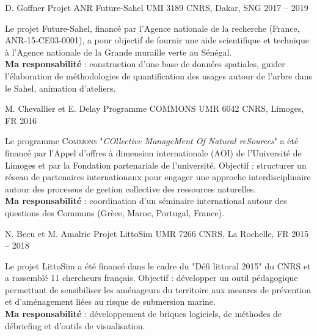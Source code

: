 \begin{cventries}
  \cventry
  {D. Goffner} %
  {Projet ANR Future-Sahel} %
  {UMI 3189 CNRS, Dakar, SNG} %
  {2017 -- 2019} %
  {
    \begin{cvitems} %
    Le projet Future-Sahel, financé par l’Agence nationale de la recherche (France, ANR‑15‑CE03‑0001), a pour objectif de fournir une aide scientifique et technique à l’Agence nationale de la Grande muraille verte au Sénégal.\\
    \textbf{Ma responsabilité} : construction d’une base de données spatiales, guider l'élaboration de méthodologies de quantification des usages autour de l’arbre dans le Sahel, animation d’ateliers.
    \end{cvitems}
  }

  \cventry
  {M. Chevallier et E. Delay} %
  {Programme COMMONS} %
  {UMR 6042 CNRS, Limoges, FR} %
  {2016} %
  {
    \begin{cvitems} %
      Le programme \textsc{Commons} "\textit{COllective ManageMent Of Natural reSources}" a été financé par l’Appel d’offres à dimension internationale (AOI) de l’Université de Limoges et par la Fondation partenariale de l’université. Objectif : structurer un réseau de partenaires internationaux pour engager une approche interdisciplinaire autour des processus de gestion collective des ressources naturelles.\\
      \textbf{Ma responsabilité} : coordination d'un séminaire international autour des questions des Communs (Grèce, Maroc, Portugal, France).
    \end{cvitems}
  }

  \cventry
  {N. Becu et M. Amalric} %
  {Projet LittoSim} %
  {UMR 7266 CNRS, La Rochelle, FR} %
  {2015 -- 2018} %
  {
    \begin{cvitems} %
      Le projet LittoSim a été financé dans le cadre du "Défi littoral 2015" du CNRS et a rassemblé 11 chercheurs français. Objectif : développer un outil pédagogique permettant de sensibiliser les aménageurs du territoire aux mesures de prévention et d'aménagement liées au risque de submersion marine.\\
      \textbf{Ma responsabilité} : développement de briques logiciels, de méthodes de débriefing et d’outils de visualisation.
    \end{cvitems}
    }


\end{cventries}
